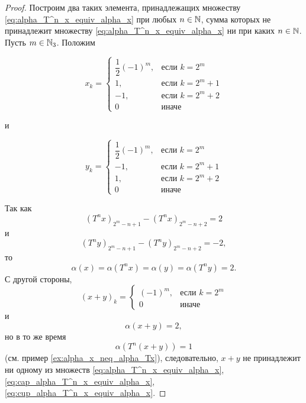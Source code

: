 \begin{proof}
	Построим два таких элемента, принадлежащих множеству \eqref{eq:alpha_T^n_x_equiv_alpha_x} при любых $n\in\mathbb{N}$,
	сумма которых не принадлежит множеству \eqref{eq:alpha_T^n_x_equiv_alpha_x} ни при каких $n\in\mathbb{N}$.
	Пусть $m\in\mathbb{N}_3$.
	Положим

	\begin{equation}
		x_k = \begin{cases}
			\dfrac{1}{2}(-1)^m,  & \mbox{если } k = 2^m     \\
			1,                   & \mbox{если } k = 2^m + 1 \\
			-1,                  & \mbox{если } k = 2^m + 2 \\
			0                    & \mbox{иначе }
		\end{cases}
	\end{equation}

	и

	\begin{equation}
		y_k = \begin{cases}
			\dfrac{1}{2}(-1)^m,  & \mbox{если } k = 2^m     \\
			-1,                  & \mbox{если } k = 2^m + 1 \\
			1,                   & \mbox{если } k = 2^m + 2 \\
			0                    & \mbox{иначе }
		\end{cases}
	\end{equation}

	Так как
	\begin{equation}
		(T^n x)_{2^m-n+1} - (T^n x)_{2^m-n+2} = 2
	\end{equation}
	и
	\begin{equation}
		(T^n y)_{2^m-n+1} - (T^n y)_{2^m-n+2} = -2
		,
	\end{equation}
	то
	\begin{equation}
		\alpha(x) = \alpha(T^n x) = \alpha(y) = \alpha(T^n y) = 2
		.
	\end{equation}
	С другой стороны,
	\begin{equation}
		(x+y)_k = \begin{cases}
			(-1)^m,  & \mbox{если } k = 2^m     \\
			0        & \mbox{иначе }
		\end{cases}
	\end{equation}
	и
	\begin{equation}
		\alpha(x+y) = 2
		,
	\end{equation}
	но в то же время
	\begin{equation}
		\alpha(T^n(x+y)) = 1
	\end{equation}
	(см. пример \ref{ex:alpha_x_neq_alpha_Tx}),
	следовательно, $x+y$ не принадлежит ни одному из множеств
	\eqref{eq:alpha_T^n_x_equiv_alpha_x}, \eqref{eq:cap_alpha_T^n_x_equiv_alpha_x}, \eqref{eq:cup_alpha_T^n_x_equiv_alpha_x}.
\end{proof}




